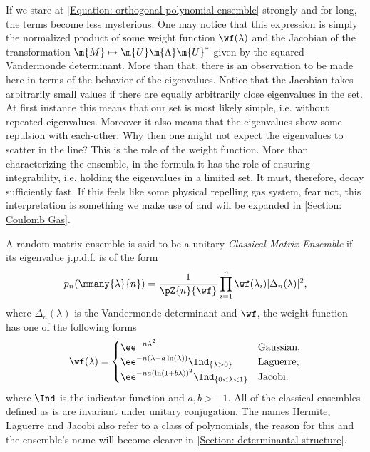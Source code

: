 If we stare at \eqref{Equation: orthogonal polynomial ensemble} strongly and for long, the terms become less mysterious. One  may notice that this expression is simply the normalized product of some weight function $\wf(\lambda)$ and the Jacobian of the transformation $\m{M} \mapsto \m{U} \m{\Lambda} \m{U}^{*}$ given by the squared Vandermonde determinant. More than that, there is an observation to be made here in terms of the behavior of the eigenvalues. Notice that the Jacobian takes arbitrarily small values if there are equally arbitrarily close eigenvalues in the set. At first instance this means that our set is most likely simple, i.e. without repeated eigenvalues. Moreover it also means that the eigenvalues show some repulsion with each-other. Why then one might not expect the eigenvalues to scatter in the line? This is the role of the weight function. More than characterizing the ensemble, in the formula it has the role of ensuring integrability, i.e. holding the eigenvalues in a limited set. It must, therefore, decay sufficiently fast. If this feels like some physical repelling gas system, fear not, this interpretation is something we make use of and will be expanded in \autoref{Section: Coulomb Gas}.


\begin{exemplo} 	\label{Example: Classical Ensembles}
	A random matrix ensemble is said to be a unitary \textit{Classical Matrix Ensemble} if its eigenvalue j.p.d.f. is of the form
	\begin{equation}
		p_n(\mmany{\lambda}{n}) = \frac{1}{\pZ{n}{\wf}} \prod_{i=1}^{n} \wf(\lambda_i) |\Delta_n(\lambda)|^2,
	\end{equation}
	where $\Delta_n(\lambda)$ is the Vandermonde determinant and $\wf$, the weight function has one of the following forms
	\begin{equation}
		\wf(\lambda) = \begin{cases}
			\ee^{-n \lambda^2} & \text{Gaussian}, \\
			\ee^{-n \left(\lambda - a \ln (\lambda) \right)} \Ind_{\{\lambda>0\}} & \text{Laguerre}, \\
			\ee^{-n a \left( \ln (1+ b\lambda) \right)^2} \Ind_{\{0<\lambda<1\}} & \text{Jacobi}.
		\end{cases}
	\end{equation}
	where $\Ind$ is the indicator function and $a,b > -1$. All of the classical ensembles defined as is are invariant under unitary conjugation. The names Hermite, Laguerre and Jacobi also refer to a class of polynomials, the reason for this and the ensemble's name will become clearer in \autoref{Section: determinantal structure}.
\end{exemplo}


